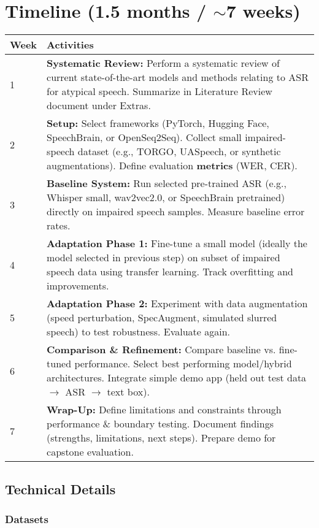 \documentclass{article}
\begin{document}
\section{Timeline (1.5 months / $\sim$7 weeks)}

\begin{tabularx}{\textwidth}{@{}lX@{}}
\toprule
Week & Activities \\
\midrule
1 & \textbf{Systematic Review:} Perform a systematic review of current state-of-the-art models and methods relating to ASR for atypical speech. Summarize in Literature Review document under Extras. \\
\hline
2 & \textbf{Setup:} Select frameworks (PyTorch, Hugging Face, SpeechBrain, or OpenSeq2Seq). Collect small impaired-speech dataset (e.g., TORGO, UASpeech, or synthetic augmentations). Define evaluation \textbf{metrics} (WER, CER). \\
\hline
3 & \textbf{Baseline System:} Run selected pre-trained ASR (e.g., Whisper small, wav2vec2.0, or SpeechBrain pretrained) directly on impaired speech samples. Measure baseline error rates. \\
\hline
4 & \textbf{Adaptation Phase 1:} Fine-tune a small model (ideally the model selected in previous step) on subset of impaired speech data using transfer learning. Track overfitting and improvements. \\
\hline
5 & \textbf{Adaptation Phase 2:} Experiment with data augmentation (speed perturbation, SpecAugment, simulated slurred speech) to test robustness. Evaluate again. \\
\hline
6 & \textbf{Comparison \& Refinement:} Compare baseline vs. fine-tuned performance. Select best performing model/hybrid architectures. Integrate simple demo app (held out test data $\rightarrow$ ASR $\rightarrow$ text box). \\
\hline
7 & \textbf{Wrap-Up:} Define limitations and constraints through performance \& boundary testing. Document findings (strengths, limitations, next steps). Prepare demo for capstone evaluation. \\
\bottomrule
\end{tabularx}


\subsection{Technical Details}

\subsubsection{Datasets}
\end{document}
